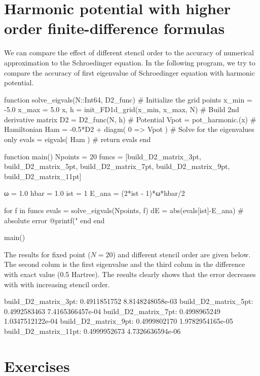 \section{Harmonic potential with higher order finite-difference formulas}

We can compare the effect of different stencil order to the accuracy of numerical approximation
to the Schroedinger equation. In the following program, we try to compare the accuracy of
first eigenvalue of Schroedinger equation with harmonic potential.

\begin{juliacode}
function solve_eigvals(N::Int64, D2_func)
  # Initialize the grid points
  x_min = -5.0
  x_max =  5.0
  x, h = init_FD1d_grid(x_min, x_max, N)
  # Build 2nd derivative matrix
  D2 = D2_func(N, h)
  # Potential
  Vpot = pot_harmonic.(x)
  # Hamiltonian
  Ham = -0.5*D2 + diagm( 0 => Vpot )
  # Solve for the eigenvalues only
  evals = eigvals( Ham )
  #
  return evals
end

function main()
  Npoints = 20
  funcs = [build_D2_matrix_3pt, build_D2_matrix_5pt, build_D2_matrix_7pt,
           build_D2_matrix_9pt, build_D2_matrix_11pt]

  ω = 1.0
  hbar = 1.0
  ist = 1
  E_ana = (2*ist - 1)*ω*hbar/2

  for f in funcs
      evals = solve_eigvals(Npoints, f)
      dE = abs(evals[ist]-E_ana) # absolute error
      @printf("%
  end
end

main()
\end{juliacode}

The results for fixed point ($N=20$) and different stencil order are given below.
The second colum is the first eigenvalue and the third colum in the difference with
exact value (0.5 Hartree). The results clearly shows that the error decreases with
with increasing stencil order.

\begin{textcode}
  build_D2_matrix_3pt:       0.4911851752   8.8148248058e-03
  build_D2_matrix_5pt:       0.4992583463   7.4165366457e-04
  build_D2_matrix_7pt:       0.4998965249   1.0347512122e-04
  build_D2_matrix_9pt:       0.4999802170   1.9782954165e-05
 build_D2_matrix_11pt:       0.4999952673   4.7326636594e-06
\end{textcode}

\section{Exercises}

